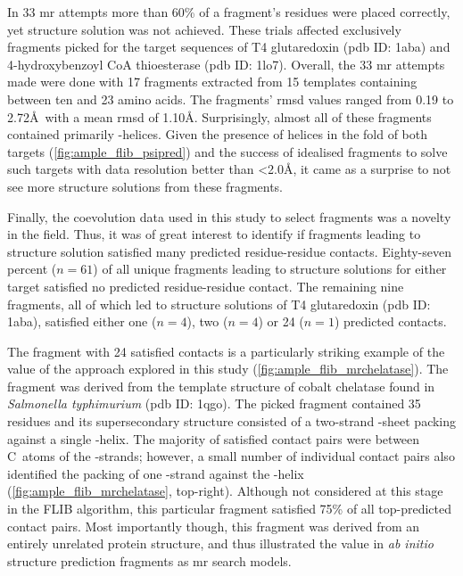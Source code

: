 In 33 \gls{mr} attempts more than 60\% of a fragment's residues were placed correctly, yet structure solution was not achieved. These trials affected exclusively fragments picked for the target sequences of T4 glutaredoxin (\gls{pdb} ID: 1aba) and 4-hydroxybenzoyl CoA thioesterase (\gls{pdb} ID: 1lo7). Overall, the 33 \gls{mr} attempts made were done with 17 fragments extracted from 15 templates containing between ten and 23 amino acids. The fragments' \gls{rmsd} values ranged from 0.19 to 2.72\AA\ with a mean \gls{rmsd} of 1.10\AA. Surprisingly, almost all of these fragments contained primarily \textalpha-helices. Given the presence of helices in the fold of both targets (\cref{fig:ample_flib_psipred}) and the success of idealised fragments to solve such targets with data resolution better than <2.0\AA, it came as a surprise to not see more structure solutions from these fragments.

Finally, the coevolution data used in this study to select fragments was a novelty in the field. Thus, it was of great interest to identify if fragments leading to structure solution satisfied many predicted residue-residue contacts. Eighty-seven percent ($n=61$) of all unique fragments leading to structure solutions for either target satisfied no predicted residue-residue contact. The remaining nine fragments, all of which led to structure solutions of T4 glutaredoxin (\gls{pdb} ID: 1aba), satisfied either one ($n=4$), two ($n=4$) or 24 ($n=1$) predicted contacts. 

The fragment with 24 satisfied contacts is a particularly striking example of the value of the approach explored in this study (\cref{fig:ample_flib_mrchelatase}). The fragment was derived from the template structure of cobalt chelatase found in \textit{Salmonella typhimurium} (\gls{pdb} ID: 1qgo). The picked fragment contained 35 residues and its supersecondary structure consisted of a two-strand \textbeta-sheet packing against a single \textalpha-helix. The majority of satisfied contact pairs were between C\textbeta\ atoms of the \textbeta-strands; however, a small number of individual contact pairs also identified the packing of one \textbeta-strand against the \textalpha-helix (\cref{fig:ample_flib_mrchelatase}, top-right). Although not considered at this stage in the FLIB algorithm, this particular fragment satisfied 75\% of all top-predicted contact pairs. Most importantly though, this fragment was derived from an entirely unrelated protein structure, and thus illustrated the value in \textit{ab initio} structure prediction fragments as \gls{mr} search models.

